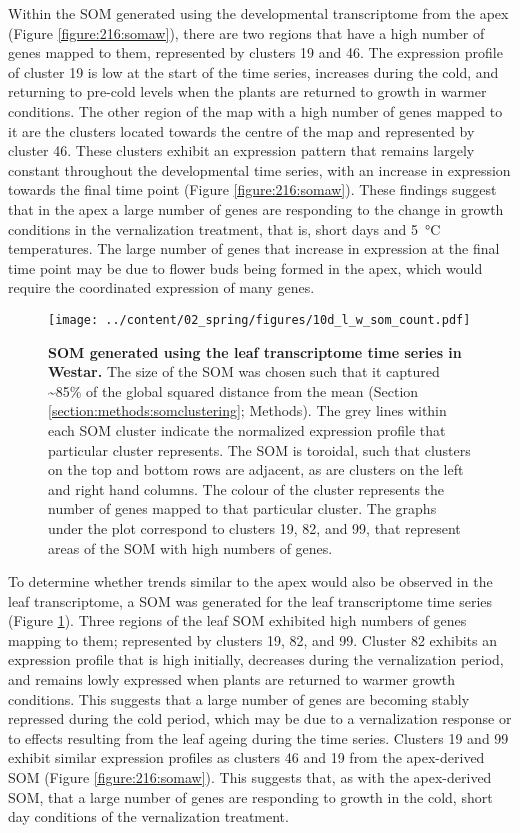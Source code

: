 \documentclass[12pt,]{book}
\begin{document}
Within the SOM generated using the developmental transcriptome from the
apex (Figure \ref{figure:216:somaw}), there are two regions that have a
high number of genes mapped to them, represented by clusters 19 and 46.
The expression profile of cluster 19 is low at the start of the time
series, increases during the cold, and returning to pre-cold levels when
the plants are returned to growth in warmer conditions. The other region
of the map with a high number of genes mapped to it are the clusters
located towards the centre of the map and represented by cluster 46.
These clusters exhibit an expression pattern that remains largely
constant throughout the developmental time series, with an increase in
expression towards the final time point (Figure \ref{figure:216:somaw}).
These findings suggest that in the apex a large number of genes are
responding to the change in growth conditions in the vernalization
treatment, that is, short days and 5~°C temperatures. The large number
of genes that increase in expression at the final time point may be due
to flower buds being formed in the apex, which would require the
coordinated expression of many genes.

\begin{figure}[htbp]
\centering
\texttt{[image: ../content/02\_spring/figures/10d\_l\_w\_som\_count.pdf]}
\caption{\textbf{SOM generated using the leaf transcriptome time series
in Westar.} The size of the SOM was chosen such that it captured
\textasciitilde{}85\% of the global squared distance from the mean
(Section \ref{section:methods:somclustering}; Methods). The grey lines
within each SOM cluster indicate the normalized expression profile that
particular cluster represents. The SOM is toroidal, such that clusters
on the top and bottom rows are adjacent, as are clusters on the left and
right hand columns. The colour of the cluster represents the number of
genes mapped to that particular cluster. The graphs under the plot
correspond to clusters 19, 82, and 99, that represent areas of the SOM
with high numbers of genes.}\label{figure:217:somlw}
\end{figure}

To determine whether trends similar to the apex would also be observed
in the leaf transcriptome, a SOM was generated for the leaf
transcriptome time series (Figure \ref{figure:217:somlw}). Three regions
of the leaf SOM exhibited high numbers of genes mapping to them;
represented by clusters 19, 82, and 99. Cluster 82 exhibits an
expression profile that is high initially, decreases during the
vernalization period, and remains lowly expressed when plants are
returned to warmer growth conditions. This suggests that a large number
of genes are becoming stably repressed during the cold period, which may
be due to a vernalization response or to effects resulting from the leaf
ageing during the time series. Clusters 19 and 99 exhibit similar
expression profiles as clusters 46 and 19 from the apex-derived SOM
(Figure \ref{figure:216:somaw}). This suggests that, as with the
apex-derived SOM, that a large number of genes are responding to growth
in the cold, short day conditions of the vernalization treatment.
\end{document}
